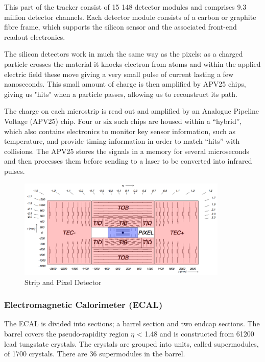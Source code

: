 This part of the tracker consist of 15 148 detector
modules and comprises 9.3 million detector channels. Each detector module consists of a carbon or graphite fibre frame, which supports the silicon sensor and the associated front-end readout electronics.
 
The silicon detectors work in much the same way as the pixels: as a charged particle crosses the material it knocks electron from atoms and within the applied electric field these move giving a very small pulse of current lasting a few nanoseconds. This small amount of charge is then amplified by APV25 chips, giving us "hits" when a particle passes, allowing us to reconstruct its path.

The charge on each microstrip is read out and amplified by an Analogue Pipeline Voltage (APV25) chip. Four or six such chips are housed within a “hybrid”, which also contains electronics to monitor key sensor information, such as temperature, and provide timing information in order to match “hits” with collisions. The APV25 stores the signals in a memory for several microseconds and then processes them before sending to a laser to be converted into infrared pulses.


\begin{figure}[H]
  \centering
\includegraphics[width=10cm]{CMS_chapter_plots/strip}
  \caption{Strip and Pixel Detector \label{fig:strip}}
\end{figure}

\subsubsection{Electromagnetic Calorimeter (ECAL)}

The ECAL is divided into sections; a barrel section and two endcap sections. The barrel covers the pseudo-rapidity region $\eta$ < 1.48 and is constructed from 61200 lead tungstate crystals. The
crystals are grouped into units, called supermodules, of 1700 crystals. There are 36 supermodules in the barrel.

